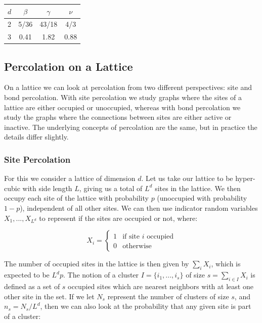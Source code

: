 \begin{center}
  \begin{tabular}{ | l | c | c | c | }
    \hline
    $d$ & $\beta$ & $\gamma$ & $\nu$ \\ \hline
    2 & 5/36 & 43/18 & 4/3 \\ \hline
    3 & 0.41 & 1.82 & 0.88 \\
    \hline
  \end{tabular}
\end{center}









\subsection{Percolation on a Lattice}
On a lattice we can look at percolation from two different perspectives: site and bond percolation.
With site percolation we study graphs where the sites of a lattice are either occupied or unoccupied, whereas with bond percolation we study the graphs where the connections between sites are either active or inactive.
The underlying concepts of percolation are the same, but in practice the details differ slightly.



\subsubsection{Site Percolation}
For this we consider a lattice of dimension $d$.
Let us take our lattice to be hyper-cubic with side length $L$, giving us a total of $L^d$ sites in the lattice.
We then occupy each site of the lattice with probability $p$ (unoccupied with probability $1 - p$), independent of all other sites.
We can then use indicator random variables $X_1, ..., X_{L^d}$ to represent if the sites are occupied or not, where:

\[
X_i =
\begin{cases}
	1 & \text{if site } i \text{ occupied} \\
	0 & \text{otherwise}
\end{cases}
\]

The number of occupied sites in the lattice is then given by $\sum_i X_i$, which is expected to be $L^d p$.
The notion of a cluster $I = \{i_1, ..., i_s\}$ of size $s = \sum_{i \in I} X_i$ is defined as a set of $s$ occupied sites which are nearest neighbors with at least one other site in the set.
If we let $N_s$ represent the number of clusters of size $s$, and $n_s = N_s / L^d$, then we can also look at the probability that any given site is part of a cluster:

